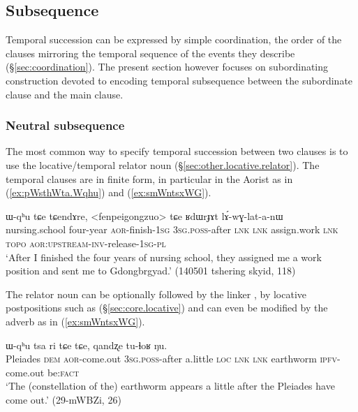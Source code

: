  \subsection{Subsequence} 
Temporal succession can be expressed by simple coordination, the order of the clauses mirroring the temporal sequence of the events they describe (§\ref{sec:coordination}). The present section however focuses on subordinating construction devoted to encoding temporal subsequence between the subordinate clause and the main clause. 

 \subsubsection{Neutral subsequence} \label{sec:subsequence.neutral}
 The most common way to specify temporal succession between two clauses is to use the locative/temporal relator noun    (§\ref{sec:other.locative.relator}). The temporal clauses are in finite form, in particular in the Aorist as in (\ref{ex:pWsthWta.Wqhu}) and (\ref{ex:smWntsxWG}).
 
 
 \begin{exe}
\ex \label{ex:pWsthWta.Wqhu}
 ɯ-qʰu tɕe tɕendɤre, <fenpeigongzuo> tɕe ʁdɯrɟɤt lɤ́-wɣ-lat-a-nɯ \\
 nursing.school four-year \textsc{aor}-finish-\textsc{1sg} \textsc{3sg}.\textsc{poss}-after \textsc{lnk} \textsc{lnk} assign.work \textsc{lnk}  \textsc{topo} \textsc{aor}:\textsc{upstream}-\textsc{inv}-release-\textsc{1sg}-\textsc{pl} \\
 \glt `After I finished the four years of nursing school, they assigned me a work position and sent me to Gdongbrgyad.' (140501 tshering skyid, 118)
 \end{exe}

The relator noun  can be optionally followed by the linker , by locative postpositions such as   (§\ref{sec:core.locative}) and can even be modified by the adverb  as in (\ref{ex:smWntsxWG}).

 \begin{exe}
\ex \label{ex:smWntsxWG}
 ɯ-qʰu tsa ri tɕe tɕe, qandʐe tu-ɬoʁ ŋu. \\
Pleiades \textsc{dem} \textsc{aor}-come.out \textsc{3sg}.\textsc{poss}-after a.little \textsc{loc} \textsc{lnk} \textsc{lnk} earthworm \textsc{ipfv}-come.out be:\textsc{fact} \\
 \glt  `The (constellation of the) earthworm appears a little after the Pleiades have come out.'  (29-mWBZi, 26)
\end{exe}
 
